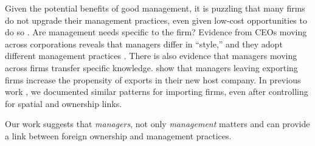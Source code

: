 \documentclass[12pt,a4paper]{article}
\begin{document}
Given the potential benefits of good management, it is puzzling that many firms do not upgrade their management practices, even given low-cost opportunities to do so \cite{Bloom2012-ek}. Are management needs specific to the firm? Evidence from CEOs moving across corporations reveals that managers differ in “style,” and they adopt different management practices \cite{Bertrand2003-io,Schoar2016-rj}. There is also evidence that managers moving across firms transfer specific knowledge. \cite{Mion2014-vi} show that managers leaving exporting firms increase the propensity of exports in their new host company. In previous work \cite{Bisztray2016-iq}, we documented similar patterns for importing firms, even after controlling for spatial and ownership links.

Our work suggests that \emph{managers}, not only \emph{management} matters and can provide a link between foreign ownership and management practices.


\end{document}
